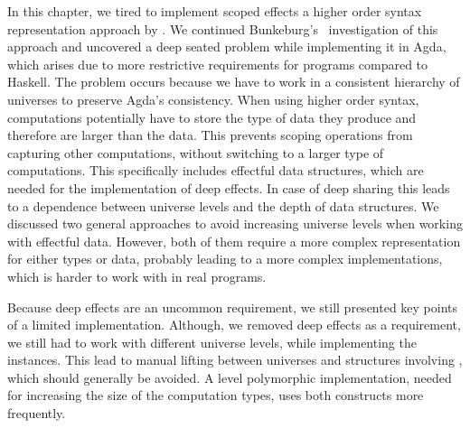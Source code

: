 In this chapter, we tired to implement scoped effects a higher order
syntax representation approach by \textcite{DBLP:conf/haskell/WuSH14}.
We continued Bunkeburg's~\cite{bunkenburg2019modeling} investigation of this
approach and uncovered a deep seated problem while implementing it in Agda,
which arises due to more restrictive requirements for programs compared to
Haskell.
The problem occurs because we have to work in a consistent hierarchy of
universes to preserve Agda's consistency.
When using higher order syntax, computations potentially have to store the type
of data they produce and therefore are larger than the data.
This prevents scoping operations from capturing other computations, without
switching to a larger type of computations.
This specifically includes effectful data structures, which are needed for the
implementation of deep effects.
In case of deep sharing this leads to a dependence between universe levels and
the depth of data structures.
We discussed two general approaches to avoid increasing universe levels when
working with effectful data.
However, both of them require a more complex representation for either types or
data, probably leading to a more complex implementations, which is harder to
work with in real programs.

Because deep effects are an uncommon requirement, we still presented key points
of a limited implementation.
Although, we removed deep effects as a requirement, we still had to work with
different universe levels, while implementing the 
instances.
This lead to manual lifting between universes and structures involving
, which should generally be avoided.
A level polymorphic implementation, needed for increasing the size of the
computation types, uses both constructs more frequently.
